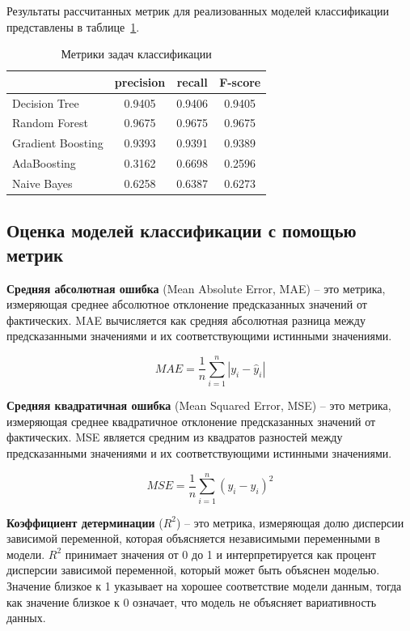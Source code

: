 Результаты рассчитанных метрик для реализованных моделей классификации представлены в таблице~\ref{tabular:table-classification}.

\begin{table}[H]
    \onehalfspacing \caption{Метрики задач классификации}
    \medskip
        \begin{tabular}{|l|c|c|c|}
        \hline
            \backslashbox{}{}  & precision & recall & F-score \\ \hline
            Decision Tree & 0.9405 & 0.9406 & 0.9405 \\  \hline 
            Random Forest & 0.9675 & 0.9675 & 0.9675 \\  \hline 
            Gradient Boosting & 0.9393 & 0.9391 & 0.9389 \\  \hline 
            AdaBoosting & 0.3162 & 0.6698 & 0.2596 \\  \hline 
            Naive Bayes & 0.6258 & 0.6387 & 0.6273 \\  \hline 
        \end{tabular}
    \label{tabular:table-classification}
\end{table}

\subsection{Оценка моделей классификации с помощью метрик}
\label{sec:Metrics-regression}

\textbf{Средняя абсолютная ошибка} (Mean Absolute Error, MAE) -- это метрика, измеряющая среднее абсолютное отклонение предсказанных значений от фактических. MAE вычисляется как средняя абсолютная разница между предсказанными значениями и их соответствующими истинными значениями.

\[
MAE = \frac{1}{n}\sum_{i=1}^{n} |y_i - \hat{y}_i|
\]

\vspace{1.5em}

\textbf{Средняя квадратичная ошибка} (Mean Squared Error, MSE) -- это метрика, измеряющая среднее квадратичное отклонение предсказанных значений от фактических. MSE является средним из квадратов разностей между предсказанными значениями и их соответствующими истинными значениями.

\[
MSE = \frac{1}{n}\sum_{i=1}^{n} (y_i - \hat{y}_i)^2
\]

\vspace{1.5em}

\textbf{Коэффициент детерминации} (\( R^2 \)) -- это метрика, измеряющая долю дисперсии зависимой переменной, которая объясняется независимыми переменными в модели. \( R^2 \) принимает значения от 0 до 1 и интерпретируется как процент дисперсии зависимой переменной, который может быть объяснен моделью. Значение близкое к 1 указывает на хорошее соответствие модели данным, тогда как значение близкое к 0 означает, что модель не объясняет вариативность данных.

